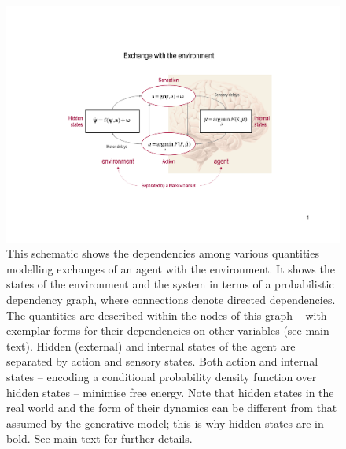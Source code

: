 \documentclass[a4paper]{article} %
\begin{document}
\begin{figure}%
 \centerline{%
\includegraphics[width=\columnwidth]{Figure1.pdf}%
}%
\caption{This schematic shows the dependencies among various
quantities modelling exchanges of an agent with the environment. It
shows the states of the environment and the system in terms of a
probabilistic dependency graph, where connections denote directed
dependencies. The quantities are described within the nodes of this
graph -- with exemplar forms for their dependencies on other variables
(see main text). Hidden (external) and internal states of the agent are
separated by action and sensory states. Both action and internal states
-- encoding a conditional probability density function over hidden
states -- minimise free energy. Note that hidden states in the real
world and the form of their dynamics can be different from that assumed
by the generative model; this is why hidden states are in bold. See main
text for further details.
}%
\label{fig:figure1}
\end{figure}
\end{document}
